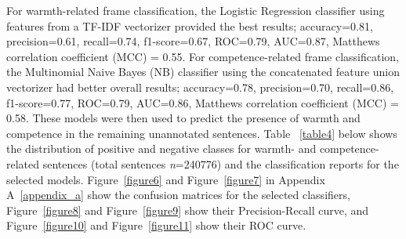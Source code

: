 \documentclass[Royal,sageapa,times]{sagej}
\begin{document}
For warmth-related frame classification, the Logistic Regression classifier using features from a TF-IDF vectorizer provided the best results; accuracy=0.81, precision=0.61, recall=0.74, f1-score=0.67, ROC=0.79, AUC=0.87, Matthews correlation coefficient (MCC) = 0.55. For competence-related frame classification, the Multinomial Naive Bayes (NB) classifier using the concatenated feature union vectorizer had better overall results; accuracy=0.78, precision=0.70, recall=0.86, f1-score=0.77, ROC=0.79, AUC=0.86, Matthews correlation coefficient (MCC) = 0.58. These models were then used to predict the presence of warmth and competence in the remaining unannotated sentences. Table ~\ref{table4} below shows the distribution of positive and negative classes for warmth- and competence-related sentences (total sentences \textit{n}=240776) and the classification reports for the selected models. Figure~\ref{figure6} and Figure~\ref{figure7} in Appendix A~\ref{appendix_a} show the confusion matrices for the selected classifiers, Figure~\ref{figure8} and Figure~\ref{figure9} show their Precision-Recall curve, and Figure~\ref{figure10} and Figure~\ref{figure11} show their ROC curve.
\end{document}
